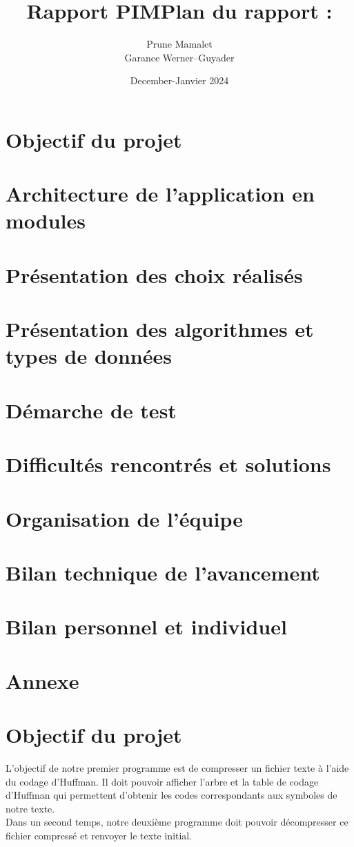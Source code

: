 \documentclass{article}
\title{\Huge Rapport PIM}
\author{Prune Mamalet\vspace{0.5cm}\\Garance Werner--Guyader }
\date{December-Janvier 2024}
\begin{document}
\maketitle
\vspace{0.5cm}
\title{\LARGE \textbf{Plan du rapport :}} 

\section{Objectif du projet}
\section{Architecture de l'application en modules}
\section{Présentation des choix réalisés}
\section{Présentation des algorithmes et types de données}
\section{Démarche de test}
\section{Difficultés rencontrés et solutions}
\section{Organisation de l'équipe}
\section{Bilan technique de l'avancement}
\section{Bilan personnel et individuel}
\section{Annexe}

\newpage
\setcounter{section}{0}


\section{Objectif du projet}
L'objectif de notre premier programme est de compresser un fichier texte à l'aide du codage d'Huffman. Il doit pouvoir afficher l'arbre et la table de codage d'Huffman qui permettent d'obtenir les codes correspondants aux symboles de notre texte.\\ Dans un second temps, notre deuxième programme doit pouvoir décompresser ce fichier compressé et renvoyer le texte initial.
\end{document}
